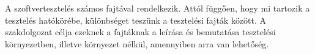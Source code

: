 A szoftvertesztelés számos fajtával rendelkezik. Attól függően, hogy mi tartozik a tesztelés hatókörébe, különbséget teszünk a tesztelési fajták között. A szakdolgozat célja ezeknek a fajtáknak a leírása és bemutatása tesztelési környezetben, illetve környezet nélkül, amennyiben arra van lehetőség.
